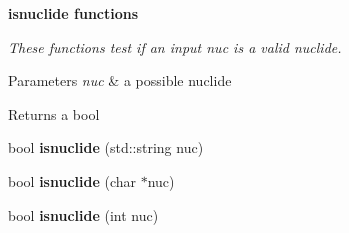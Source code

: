 \begin{Indent}{\bf isnuclide functions}\par
{\em These functions test if an input {\itshape nuc} is a valid nuclide. 
\begin{DoxyParams}{Parameters}
{\em nuc} & a possible nuclide \\
\hline
\end{DoxyParams}
\begin{DoxyReturn}{Returns}
a bool 
\end{DoxyReturn}
}\begin{DoxyCompactItemize}
\item 
\hypertarget{namespacepyne_1_1nucname_a98523777b3d9e835b929bb9e49986312}{bool {\bfseries isnuclide} (std\+::string nuc)}\label{namespacepyne_1_1nucname_a98523777b3d9e835b929bb9e49986312}

\item 
\hypertarget{namespacepyne_1_1nucname_a8c10e17441e560982994f31011c888a4}{bool {\bfseries isnuclide} (char $\ast$nuc)}\label{namespacepyne_1_1nucname_a8c10e17441e560982994f31011c888a4}

\item 
\hypertarget{namespacepyne_1_1nucname_a78423ab514ba698a3e86d808423f364b}{bool {\bfseries isnuclide} (int nuc)}\label{namespacepyne_1_1nucname_a78423ab514ba698a3e86d808423f364b}

\end{DoxyCompactItemize}
\end{Indent}
